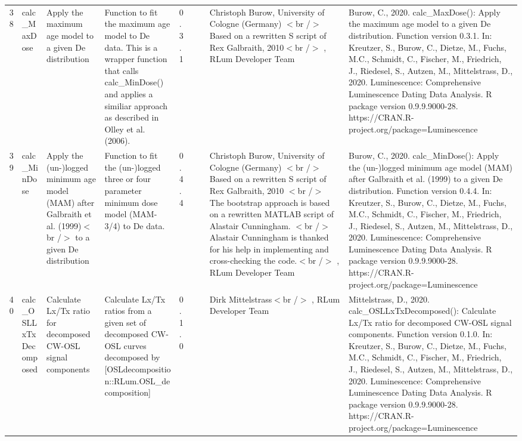 \begin{table}[ht]
\begin{tabular}{rllllllll}
 \\ 
  38 & calc\_MaxDose & Apply the maximum age model to a given De distribution & Function to fit the maximum age model to De data. This is a wrapper function that calls calc\_MinDose() and applies a similiar approach as described in Olley et al. (2006). & 0.3.1
 &  &  & Christoph Burow, University of Cologne (Germany)  $<$br /$>$ Based on a rewritten S script of Rex Galbraith, 2010$<$br /$>$ , RLum Developer Team & Burow, C., 2020. calc\_MaxDose(): Apply the maximum age model to a given De distribution. Function version 0.3.1. In: Kreutzer, S., Burow, C., Dietze, M., Fuchs, M.C., Schmidt, C., Fischer, M., Friedrich, J., Riedesel, S., Autzen, M., Mittelstrass, D., 2020. Luminescence: Comprehensive Luminescence Dating Data Analysis. R package version 0.9.9.9000-28. https://CRAN.R-project.org/package=Luminescence
 \\ 
  39 & calc\_MinDose & Apply the (un-)logged minimum age model (MAM) after Galbraith et al. (1999)$<$br /$>$ to a given De distribution & Function to fit the (un-)logged three or four parameter minimum dose model (MAM-3/4) to De data. & 0.4.4
 &  &  & Christoph Burow, University of Cologne (Germany)  $<$br /$>$ Based on a rewritten S script of Rex Galbraith, 2010  $<$br /$>$ The bootstrap approach is based on a rewritten MATLAB script of Alastair Cunningham.  $<$br /$>$ Alastair Cunningham is thanked for his help in implementing and cross-checking the code.$<$br /$>$ , RLum Developer Team & Burow, C., 2020. calc\_MinDose(): Apply the (un-)logged minimum age model (MAM) after Galbraith et al. (1999) to a given De distribution. Function version 0.4.4. In: Kreutzer, S., Burow, C., Dietze, M., Fuchs, M.C., Schmidt, C., Fischer, M., Friedrich, J., Riedesel, S., Autzen, M., Mittelstrass, D., 2020. Luminescence: Comprehensive Luminescence Dating Data Analysis. R package version 0.9.9.9000-28. https://CRAN.R-project.org/package=Luminescence
 \\ 
  40 & calc\_OSLLxTxDecomposed & Calculate Lx/Tx ratio for decomposed CW-OSL signal components & Calculate  Lx/Tx  ratios from a given set of decomposed CW-OSL curves decomposed by  [OSLdecomposition::RLum.OSL\_decomposition] & 0.1.0
 &  &  & Dirk Mittelstrass$<$br /$>$ , RLum Developer Team & Mittelstrass, D., 2020. calc\_OSLLxTxDecomposed(): Calculate Lx/Tx ratio for decomposed CW-OSL signal components. Function version 0.1.0. In: Kreutzer, S., Burow, C., Dietze, M., Fuchs, M.C., Schmidt, C., Fischer, M., Friedrich, J., Riedesel, S., Autzen, M., Mittelstrass, D., 2020. Luminescence: Comprehensive Luminescence Dating Data Analysis. R package version 0.9.9.9000-28. https://CRAN.R-project.org/package=Luminescence

\end{tabular}
\end{table}
